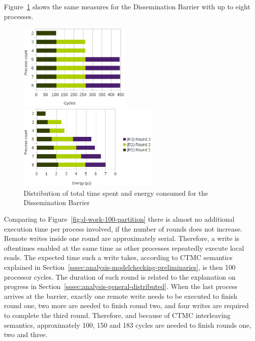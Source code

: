 \documentclass[a4paper, 10pt]{article}
\begin{document}
Figure~\ref{fig:d-work-1000-partition} shows the same measures for the Dissemination Barrier with up to eight processes.
\begin{figure}[htbp]
	\centering
	\begin{minipage}{0.43\linewidth}
		\includegraphics[height=4.2cm]{charts/d-time-work-1000-partition}
	\end{minipage}
	\begin{minipage}{0.56\linewidth}
		\includegraphics[height=4.2cm]{charts/d-energy-work-1000-partition}
	\end{minipage}
	\caption{Distribution of total time spent and energy consumed for the Dissemination Barrier}
	\label{fig:d-work-1000-partition}
\end{figure}
Comparing to Figure~\ref{fig:d-work-100-partition} there is almost no additional execution time per process involved, if the number of rounds does not increase.
Remote writes inside one round are approximately serial. Therefore, a write is oftentimes enabled at the same time as other processes repeatedly execute local reads. The expected time such a write takes, according to CTMC semantics explained in Section~\ref{sssec:analysis-modelchecking-preliminaries}, is then 100 processor cycles.
The duration of each round is related to the explanation on progress in Section~\ref{sssec:analysis-general-distributed}. When the last process arrives at the barrier, exactly one remote write needs to be executed to finish round one, two more are needed to finish round two, and four writes are required to complete the third round. Therefore, and because of CTMC interleaving semantics, approximately 100, 150 and 183 cycles are needed to finish rounds one, two and three.
\end{document}
